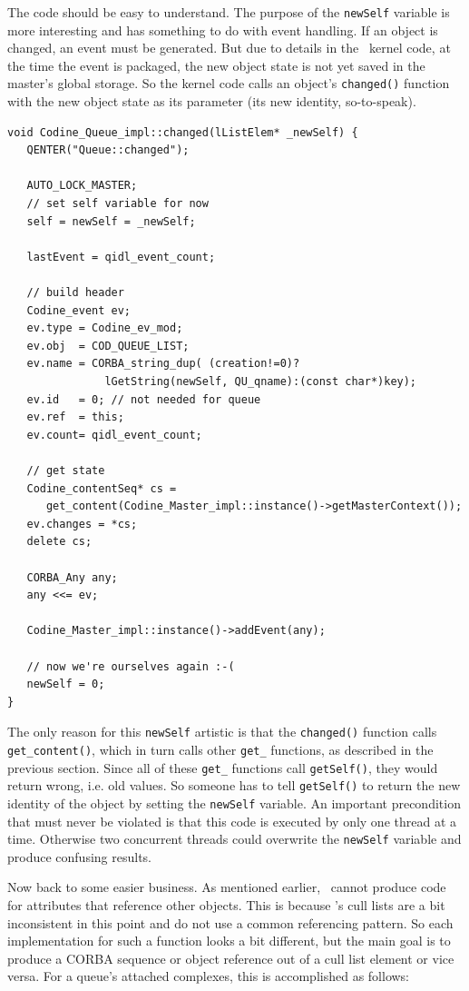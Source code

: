 The code should be easy to understand. The purpose of the \texttt{newSelf}
variable is more interesting and has something to do with event handling. If
an object is changed, an event must be generated. But due to details in the
\codine\ kernel code, at the time the event is packaged, the new object state
is not yet saved in the master's global storage. So the kernel code calls an
object's \texttt{changed()} function with the new object state as its
parameter (its new identity, so-to-speak).

\begin{Verbatim}[fontsize=\small, frame=single]
void Codine_Queue_impl::changed(lListElem* _newSelf) {
   QENTER("Queue::changed");

   AUTO_LOCK_MASTER;
   // set self variable for now
   self = newSelf = _newSelf;

   lastEvent = qidl_event_count;

   // build header
   Codine_event ev;
   ev.type = Codine_ev_mod;
   ev.obj  = COD_QUEUE_LIST;
   ev.name = CORBA_string_dup( (creation!=0)?
               lGetString(newSelf, QU_qname):(const char*)key);
   ev.id   = 0; // not needed for queue
   ev.ref  = this;
   ev.count= qidl_event_count;
   
   // get state
   Codine_contentSeq* cs = 
      get_content(Codine_Master_impl::instance()->getMasterContext());
   ev.changes = *cs;
   delete cs;

   CORBA_Any any;
   any <<= ev;

   Codine_Master_impl::instance()->addEvent(any);

   // now we're ourselves again :-(
   newSelf = 0;
}
\end{Verbatim}

The only reason for this \texttt{newSelf} artistic is that the
\texttt{changed()} function
calls \texttt{get\_content()}, which in turn calls other \texttt{get\_}
functions, as described in the previous section. Since all of these
\texttt{get\_} functions call \texttt{getSelf()}, they would return wrong,
i.e. old values. So someone has to tell \texttt{getSelf()} to return the new
identity of the object by setting the \texttt{newSelf} variable. An important
precondition that must never be violated is that this code is executed by
only one thread at a time. Otherwise two concurrent threads could overwrite
the \texttt{newSelf} variable and produce confusing results.

Now back to some easier business. As mentioned earlier, \idlgen\ cannot
produce code for attributes that reference other objects. This is because
\codine's cull lists are a bit inconsistent in this point and do not use a
common referencing pattern. So each implementation for such a function looks
a bit different, but the main goal is to produce a CORBA sequence or object
reference out of a cull list element or vice versa. For a queue's attached
complexes, this is accomplished as follows:


